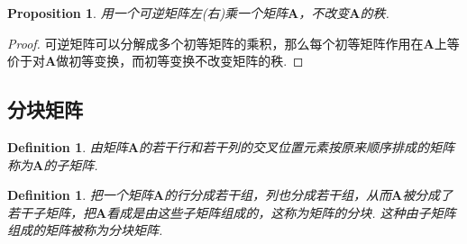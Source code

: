 \documentclass{article}
\newtheorem{proposition}[theorem]{Proposition}
\newtheorem{definition}[theorem]{Definition}
\newcommand{\mbf}[1]{\bm{#1}}
\begin{document}
\begin{proposition}
\rm 用一个可逆矩阵左(右)乘一个矩阵$\mbf{A}$，不改变$\mbf{A}$的秩.
\end{proposition}

\begin{proof}
可逆矩阵可以分解成多个初等矩阵的乘积，那么每个初等矩阵作用在$\mbf{A}$上等价于对$\mbf{A}$做初等变换，而初等变换不改变矩阵的秩. 
\end{proof}

\subsection{分块矩阵}

\begin{definition}
\rm 由矩阵$\mbf{A}$的若干行和若干列的交叉位置元素按原来顺序排成的矩阵称为$\mbf{A}$的子矩阵.
\end{definition}

\begin{definition}
\rm 把一个矩阵$\mbf{A}$的行分成若干组，列也分成若干组，从而$\mbf{A}$被分成了若干子矩阵，把$\mbf{A}$看成是由这些子矩阵组成的，这称为矩阵的分块. 这种由子矩阵组成的矩阵被称为分块矩阵.
\end{definition}
\end{document}

